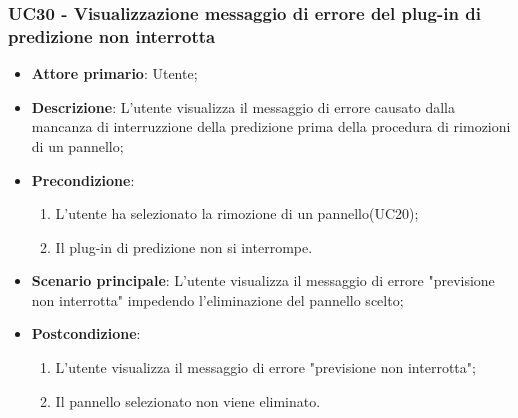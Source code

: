 \subsubsection{UC30 - Visualizzazione messaggio di errore del plug-in di predizione non interrotta}
\label{sssec:uc30}
\begin{itemize}
  \item \textbf{Attore primario}: Utente;
  \item \textbf{Descrizione}: L'utente visualizza il messaggio di errore causato dalla mancanza di interruzzione della predizione prima della procedura di rimozioni di un pannello;
  \item \textbf{Precondizione}:
  \begin{enumerate}
		\item L'utente ha selezionato la rimozione di un pannello(UC20);
		\item Il plug-in di predizione non si interrompe.
	\end{enumerate}
  \item \textbf{Scenario principale}: L'utente visualizza il messaggio di errore "previsione non interrotta" impedendo l'eliminazione del pannello scelto;
  \item \textbf{Postcondizione}:
  \begin{enumerate}
		\item L'utente visualizza il messaggio di errore "previsione non interrotta";
		\item Il pannello selezionato non viene eliminato.
	\end{enumerate}
\end{itemize}
